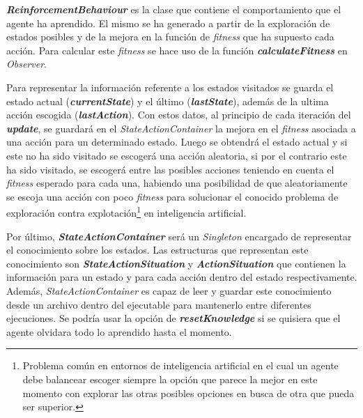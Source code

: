 \textbf{\textit{ReinforcementBehaviour}} es la clase que contiene el comportamiento que el agente ha aprendido. El mismo se ha generado a partir de la exploración de estados posibles y de la mejora en la función de \textit{fitness} que ha supuesto cada acción. Para calcular este \textit{fitness} se hace uso de la función \textbf{\textit{calculateFitness}} en \textit{Observer}.

\bigskip

Para representar la información referente a los estados visitados se guarda el estado actual (\textbf{\textit{currentState}}) y el último (\textbf{\textit{lastState}}), además de la ultima acción escogida (\textbf{\textit{lastAction}}). Con estos datos, al principio de cada iteración del \textbf{\textit{update}}, se guardará en el \textit{StateActionContainer} la mejora en el \textit{fitness} asociada a una acción para un determinado estado. Luego se obtendrá el estado actual y si este no ha sido visitado se escogerá una acción aleatoria, si por el contrario este ha sido visitado, se escogerá entre las posibles acciones teniendo en cuenta el \textit{fitness} esperado para cada una, habiendo una posibilidad de que aleatoriamente se escoja una acción con poco \textit{fitness} para solucionar el conocido problema de exploración contra explotación\footnote{Problema común en entornos de inteligencia artificial en el cual un agente debe balancear escoger siempre la opción que parece la mejor en este momento con explorar las otras posibles opciones en busca de otra que pueda ser superior.} en inteligencia artificial.

\bigskip

Por último, \textbf{\textit{StateActionContainer}} será un \textit{Singleton} encargado de representar el conocimiento sobre los estados. Las estructuras que representan este conocimiento son \textbf{\textit{StateActionSituation}} y \textbf{\textit{ActionSituation}} que contienen la información para un estado y para cada acción dentro del estado respectivamente. Además, \textit{StateActionContainer} es capaz de leer y guardar este conocimiento desde un archivo dentro del ejecutable para mantenerlo entre diferentes ejecuciones. Se podría usar la opción de \textbf{\textit{resetKnowledge}} si se quisiera que el agente olvidara todo lo aprendido hasta el momento.


